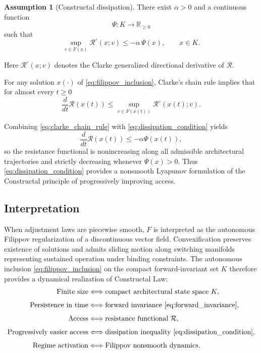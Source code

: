 \documentclass[12pt]{article}
\theoremstyle{plain}
\theoremstyle{definition}
\newtheorem{assumption}[theorem]{Assumption}
\theoremstyle{remark}
\begin{document}
\begin{assumption}[Constructal dissipation]
\label{ass:dissipation}
There exist $\alpha>0$ and a continuous function
\[
\Psi:K\to\mathbb{R}_{\ge0}
\]
such that
\begin{equation}
\sup_{v\in F(x)}
\mathcal{R}^\circ(x;v)
\le -\alpha\,\Psi(x),
\qquad x\in K .
\label{eq:dissipation_condition}
\end{equation}
\end{assumption}

Here $\mathcal{R}^\circ(x;v)$ denotes the Clarke generalized directional
derivative of $\mathcal R$.

For any solution $x(\cdot)$ of
\eqref{eq:filippov_inclusion},
Clarke’s chain rule implies that for almost every $t\ge0$
\begin{equation}
\frac{d}{dt}\mathcal{R}(x(t))
\le
\sup_{v\in F(x(t))}
\mathcal{R}^\circ(x(t);v).
\label{eq:clarke_chain_rule}
\end{equation}

Combining \eqref{eq:clarke_chain_rule} with
\eqref{eq:dissipation_condition} yields
\begin{equation}
\frac{d}{dt}\mathcal{R}(x(t))
\le -\alpha\Psi(x(t)),
\label{eq:resistance_decay}
\end{equation}
so the resistance functional is nonincreasing along all admissible
architectural trajectories and strictly decreasing whenever
$\Psi(x)>0$. Thus \eqref{eq:dissipation_condition} provides a nonsmooth Lyapunov
formulation of the Constructal principle of progressively improving
access.

\subsection{Interpretation}

When adjustment laws are piecewise smooth,
$F$ is interpreted as the autonomous Filippov regularization of a
discontinuous vector field.
Convexification preserves existence of solutions and admits sliding
motion along switching manifolds representing sustained operation under
binding constraints. The autonomous inclusion \eqref{eq:filippov_inclusion} on the compact
forward-invariant set $K$ therefore provides a dynamical realization of
Constructal Law:
\[
\begin{aligned}
\text{Finite size}
&\Longleftrightarrow
\text{compact architectural state space } K,
\\[4pt]
\text{Persistence in time}
&\Longleftrightarrow
\text{forward invariance \eqref{eq:forward_invariance}},
\\[4pt]
\text{Access}
&\Longleftrightarrow
\text{resistance functional } \mathcal{R},
\\[4pt]
\text{Progressively easier access}
&\Longleftrightarrow
\text{dissipation inequality \eqref{eq:dissipation_condition}},
\\[4pt]
\text{Regime activation}
&\Longleftrightarrow
\text{Filippov nonsmooth dynamics}.
\end{aligned}
\]
\end{document}

